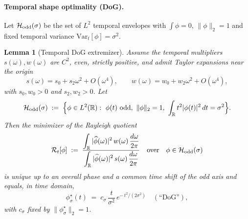 \documentclass[10pt]{article}
\theoremstyle{definition}
\theoremstyle{plain}
\newtheorem{lemma}{Lemma}[section]
\begin{document}
\paragraph{Temporal shape optimality (DoG).}\label{par:uom-main-059}
Let $\mathcal H_{\rm odd}(\sigma)$ be the set of $L^2$ temporal envelopes with $\int \phi=0$,
$\|\phi\|_2=1$ and fixed temporal variance $\mathrm{Var}_t[\phi]=\sigma^2$.

\begin{lemma}[Temporal DoG extremizer]
\label{lem:dog-opt}
Assume the temporal multipliers $s(\omega),w(\omega)$ are $C^2$, even, strictly positive, and
admit Taylor expansions near the origin
\[
s(\omega)=s_0+s_2\omega^2+O(\omega^4),\qquad
w(\omega)=w_0+w_2\omega^2+O(\omega^4),
\]
with $s_0,w_0>0$ and $s_2,w_2>0$. Let
\[
\mathcal H_{\rm odd}(\sigma)\;:=\;\Big\{\phi\in L^2(\mathbb R):\ \phi(t)\text{ odd},\ 
\|\phi\|_2=1,\ \int_{\mathbb R} t^2|\phi(t)|^2\,dt=\sigma^2\Big\}.
\]
Then the minimizer of the Rayleigh quotient
\[
\mathcal R_t[\phi]\;:=\;\frac{\displaystyle\int_{\mathbb R} |\widehat\phi(\omega)|^2\,w(\omega)\,\frac{d\omega}{2\pi}}
                           {\displaystyle\int_{\mathbb R} |\widehat\phi(\omega)|^2\,s(\omega)\,\frac{d\omega}{2\pi}}
\quad\text{over}\quad \phi\in\mathcal H_{\rm odd}(\sigma)
\]
is unique up to an overall phase and a common time shift of the odd axis and equals, in time domain,
\[
\phi^\star_\sigma(t)\;=\;c_\sigma\,\frac{t}{\sigma^2}\,e^{-\,t^2/(2\sigma^2)}\quad(\text{``DoG''}),
\]
with $c_\sigma$ fixed by $\|\phi^\star_\sigma\|_2=1$.
\end{lemma}
\end{document}
